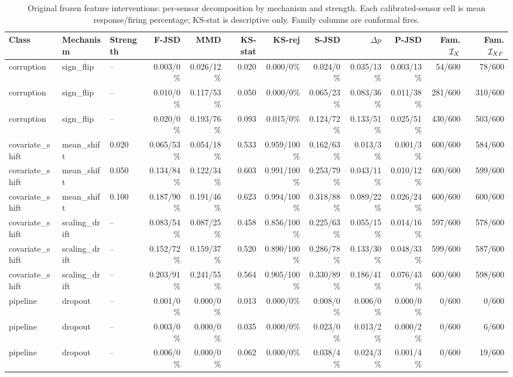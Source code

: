\begin{table}[!t]
\caption{Original frozen feature interventions: per-sensor decomposition by mechanism and strength. Each calibrated-sensor cell is mean response/firing percentage; KS-stat is descriptive only. Family columns are conformal fires.}
\label{tab:v137-decomp-2}
\centering\scriptsize\renewcommand{\arraystretch}{0.94}\setlength{\tabcolsep}{2.1pt}
\begin{tabular}{@{}lllrrrrrrrrr@{}}
\toprule
Class & Mechanism & Strength & F-JSD & MMD & KS-stat & KS-rej & S-JSD & $\Delta p$ & P-JSD & Fam. $\mathcal I_X$ & Fam. $\mathcal I_{XF}$ \\
\midrule
corruption & sign\_flip & -- & 0.003/0\% & 0.026/12\% & 0.020 & 0.000/0\% & 0.024/0\% & 0.035/13\% & 0.003/13\% & 54/600 & 78/600 \\
corruption & sign\_flip & -- & 0.010/0\% & 0.117/53\% & 0.050 & 0.000/0\% & 0.065/23\% & 0.083/36\% & 0.011/38\% & 281/600 & 310/600 \\
corruption & sign\_flip & -- & 0.020/0\% & 0.193/76\% & 0.093 & 0.015/0\% & 0.124/72\% & 0.133/51\% & 0.025/51\% & 430/600 & 503/600 \\
covariate\_shift & mean\_shift & 0.020 & 0.065/53\% & 0.054/18\% & 0.533 & 0.959/100\% & 0.162/63\% & 0.013/3\% & 0.001/3\% & 600/600 & 584/600 \\
covariate\_shift & mean\_shift & 0.050 & 0.134/84\% & 0.122/34\% & 0.603 & 0.991/100\% & 0.253/79\% & 0.043/11\% & 0.010/12\% & 600/600 & 599/600 \\
covariate\_shift & mean\_shift & 0.100 & 0.187/90\% & 0.191/46\% & 0.623 & 0.994/100\% & 0.318/88\% & 0.089/22\% & 0.026/24\% & 600/600 & 600/600 \\
covariate\_shift & scaling\_drift & -- & 0.083/54\% & 0.087/25\% & 0.458 & 0.856/100\% & 0.225/63\% & 0.055/15\% & 0.014/16\% & 597/600 & 578/600 \\
covariate\_shift & scaling\_drift & -- & 0.152/72\% & 0.159/37\% & 0.520 & 0.890/100\% & 0.286/78\% & 0.133/30\% & 0.048/33\% & 599/600 & 587/600 \\
covariate\_shift & scaling\_drift & -- & 0.203/91\% & 0.241/55\% & 0.564 & 0.905/100\% & 0.330/89\% & 0.186/41\% & 0.076/43\% & 600/600 & 598/600 \\
pipeline & dropout & -- & 0.001/0\% & 0.000/0\% & 0.013 & 0.000/0\% & 0.008/0\% & 0.006/0\% & 0.000/0\% & 0/600 & 0/600 \\
pipeline & dropout & -- & 0.003/0\% & 0.000/0\% & 0.035 & 0.000/0\% & 0.023/0\% & 0.013/2\% & 0.000/2\% & 0/600 & 6/600 \\
pipeline & dropout & -- & 0.006/0\% & 0.000/0\% & 0.062 & 0.000/0\% & 0.038/4\% & 0.024/3\% & 0.001/4\% & 0/600 & 19/600 \\
\bottomrule
\end{tabular}
\end{table}

